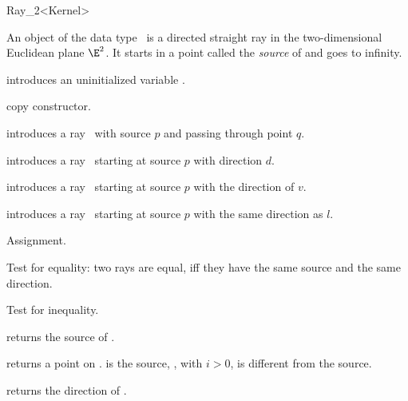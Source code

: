 \begin{ccRefClass}{Ray_2<Kernel>}

\ccDefinition
An object  of the data type \ccRefName\ is a directed
straight ray in the two-dimensional Euclidean plane $\E^2$. It starts
in a  point called the {\em source} of   and goes to infinity.

\ccCreation
{}


\ccHidden {}
             {introduces an uninitialized variable \ccVar.}

\ccHidden {}
 	    {copy constructor.}

            {introduces a ray \ccVar\ 
             with source $p$ and passing through point $q$.}

            {introduces a ray \ccVar\ starting at source $p$ with 
             direction $d$.}

            {introduces a ray \ccVar\ starting at source $p$ with 
             the direction of $v$.}

            {introduces a ray \ccVar\ starting at source $p$ with 
             the same direction as $l$.}

\ccOperations

\ccHidden {}
        {Assignment.}

       {Test for equality: two rays are equal, iff they have the same 
        source and the same direction.}

       {Test for inequality.}

       {returns the source of \ccVar.}

       {returns a point on \ccVar.  is the source,
        \ccStyle{point(i)}, with $i>0$, is different from the 
        source. }

       {returns the direction of \ccVar.}


\end{ccRefClass}
